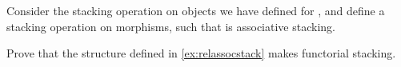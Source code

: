 \begin{exercise}
    \label{ex:relassocstack}
    Consider the stacking operation on objects we have defined for \cCat{\Set}, and define a stacking operation on morphisms, such that \cCat{\Rel} is associative stacking.
\end{exercise}

\begin{solution}
\end{solution}
\begin{exercise}
    \label{ex:relfuncstack}
    Prove that the structure defined in \cref{ex:relassocstack} makes \cCat{\Rel} functorial stacking.
\end{exercise}

\begin{solution}
\end{solution}

